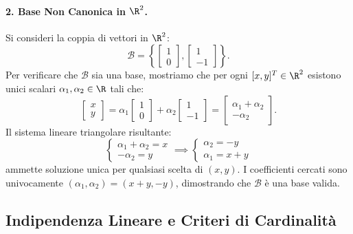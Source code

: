 \paragraph{2. Base Non Canonica in $\R^2$.}
Si consideri la coppia di vettori in $\R^2$:
\begin{equation}
    \mathcal{B} = \left\{ \begin{bmatrix} 1 \\ 0 \end{bmatrix}, \begin{bmatrix} 1 \\ -1 \end{bmatrix} \right\}.
\end{equation}
Per verificare che $\mathcal{B}$ sia una base, mostriamo che per ogni $[x, y]^T \in \R^2$ esistono unici scalari $\alpha_1, \alpha_2 \in \R$ tali che:
\begin{equation}
    \begin{bmatrix} x \\ y \end{bmatrix} = \alpha_1 \begin{bmatrix} 1 \\ 0 \end{bmatrix} + \alpha_2 \begin{bmatrix} 1 \\ -1 \end{bmatrix} = \begin{bmatrix} \alpha_1 + \alpha_2 \\ -\alpha_2 \end{bmatrix}.
\end{equation}
Il sistema lineare triangolare risultante:
\begin{equation}
    \begin{cases} \alpha_1 + \alpha_2 = x \\ -\alpha_2 = y \end{cases} \implies \begin{cases} \alpha_2 = -y \\ \alpha_1 = x + y \end{cases}
\end{equation}
ammette soluzione unica per qualsiasi scelta di $(x, y)$. I coefficienti cercati sono univocamente $(\alpha_1, \alpha_2) = (x+y, -y)$, dimostrando che $\mathcal{B}$ è una base valida.

\subsection{Indipendenza Lineare e Criteri di Cardinalità}

